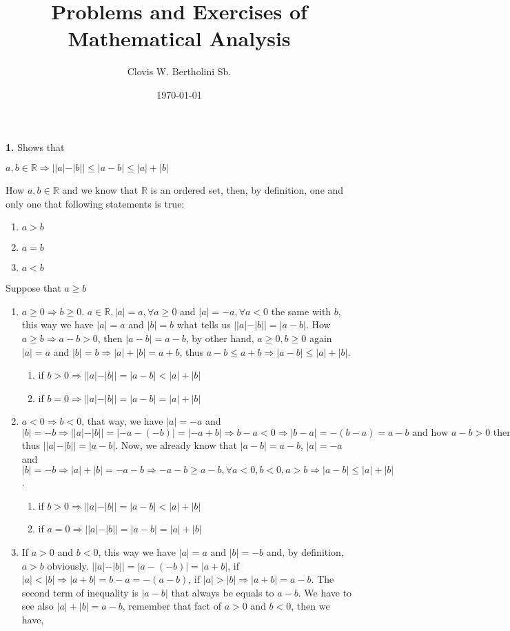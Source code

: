 \documentclass{amsart}
\author{Clovis W. Bertholini Sb.}
\title{Problems and Exercises of Mathematical Analysis}
\date{\today}
\begin{document}
\maketitle
\textbf{1.} Shows that
\begin{center}
$a,b \in \mathbb{R} \Rightarrow ||a|-|b||\leq |a-b| \leq |a|+|b|$
\end{center}
How $a,b\in\mathbb{R}$ and we know that $\mathbb{R}$ is an ordered set, then, by definition, one and only one that following statements is true:
\begin{enumerate}
\item $a>b$
\item $a=b$
\item $a<b$
\end{enumerate}
Suppose that $a\geq b$
\begin{enumerate}
\item $a\geq0\Rightarrow b\geq0$. $a\in\mathbb{R},|a|=a, \forall a\geq0$ and $|a|=-a, \forall a<0$ the same with $b$, this way we have $|a|=a$ and $|b|=b$ what tells us $||a|-|b||=|a-b|$. How $a\geq b\Rightarrow a-b>0$, then $|a-b|=a-b$, by other hand, $a\geq0,b\geq0$ again $|a|=a$ and $|b|=b\Rightarrow|a|+|b|=a+b$, thus $a-b\leq a+b\Rightarrow|a-b|\leq|a|+|b|$.
\begin{center}
\begin{enumerate}
    \item if $b>0 \Rightarrow ||a|-|b||=|a-b|<|a|+|b|$
    \item if $b=0 \Rightarrow ||a|-|b||=|a-b|=|a|+|b|$
\end{enumerate}
\end{center}
\item $a<0 \Rightarrow b<0$, that way, we have $|a|=-a$ and $|b|=-b \Rightarrow ||a|-|b||=|-a-(-b)|=|-a+b| \Rightarrow b-a<0 \Rightarrow |b-a|=-(b-a)=a-b \text{ and how }a-b>0 \text{ then }|a-b|=a-b$ thus $||a|-|b||=|a-b|$. Now, we already know that $|a-b|=a-b$, $|a|=-a$ and $|b|=-b \Rightarrow |a|+|b|=-a-b \Rightarrow -a-b\geq a-b, \forall a<0, b<0, a>b\Rightarrow |a-b|\leq|a|+|b|$.
\begin{center}
\begin{enumerate}
    \item if $b>0 \Rightarrow ||a|-|b||=|a-b|<|a|+|b|$
    \item if $a=0 \Rightarrow ||a|-|b||=|a-b|=|a|+|b|$
\end{enumerate}
\end{center}
\item If $a>0$ and $b<0$, this way we have $|a|=a$ and $|b|=-b$ and, by definition, $a>b$ obviously. $||a|-|b||=|a-(-b)|=|a+b|$, if $|a|<|b| \Rightarrow |a+b|=b-a=-(a-b)$, if $|a|>|b| \Rightarrow |a+b|=a-b$. The second term of inequality is $|a-b|$ that always be equals to $a-b$. We have to see also $|a|+|b|=a-b$, remember that fact of $a>0$ and $b<0$, then we have,

\end{enumerate}
\end{document}
